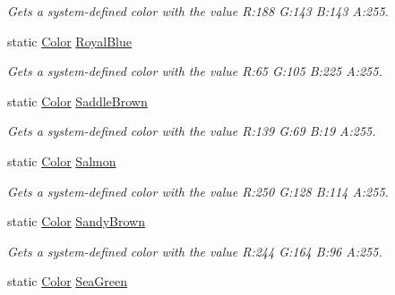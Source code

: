 \begin{DoxyCompactItemize}
\begin{DoxyCompactList}\small\item\em Gets a system-\/defined color with the value R\+:188 G\+:143 B\+:143 A\+:255.\end{DoxyCompactList}\item 
static \hyperlink{structMicrosoft_1_1Xna_1_1Framework_1_1Color}{Color} \hyperlink{structMicrosoft_1_1Xna_1_1Framework_1_1Color_af57939749aee65d23cd0827f841c6aa6}{Royal\+Blue}
\begin{DoxyCompactList}\small\item\em Gets a system-\/defined color with the value R\+:65 G\+:105 B\+:225 A\+:255.\end{DoxyCompactList}\item 
static \hyperlink{structMicrosoft_1_1Xna_1_1Framework_1_1Color}{Color} \hyperlink{structMicrosoft_1_1Xna_1_1Framework_1_1Color_a1afcc3741dd8cfdcaa6e5eed72b37eb4}{Saddle\+Brown}
\begin{DoxyCompactList}\small\item\em Gets a system-\/defined color with the value R\+:139 G\+:69 B\+:19 A\+:255.\end{DoxyCompactList}\item 
static \hyperlink{structMicrosoft_1_1Xna_1_1Framework_1_1Color}{Color} \hyperlink{structMicrosoft_1_1Xna_1_1Framework_1_1Color_a28950cae146758579e14171090d36462}{Salmon}
\begin{DoxyCompactList}\small\item\em Gets a system-\/defined color with the value R\+:250 G\+:128 B\+:114 A\+:255.\end{DoxyCompactList}\item 
static \hyperlink{structMicrosoft_1_1Xna_1_1Framework_1_1Color}{Color} \hyperlink{structMicrosoft_1_1Xna_1_1Framework_1_1Color_a1c7bec384c796341d16d863d301d7679}{Sandy\+Brown}
\begin{DoxyCompactList}\small\item\em Gets a system-\/defined color with the value R\+:244 G\+:164 B\+:96 A\+:255.\end{DoxyCompactList}\item 
static \hyperlink{structMicrosoft_1_1Xna_1_1Framework_1_1Color}{Color} \hyperlink{structMicrosoft_1_1Xna_1_1Framework_1_1Color_a627c960778761dfe508642cb453b2bce}{Sea\+Green}

\end{DoxyCompactItemize}

